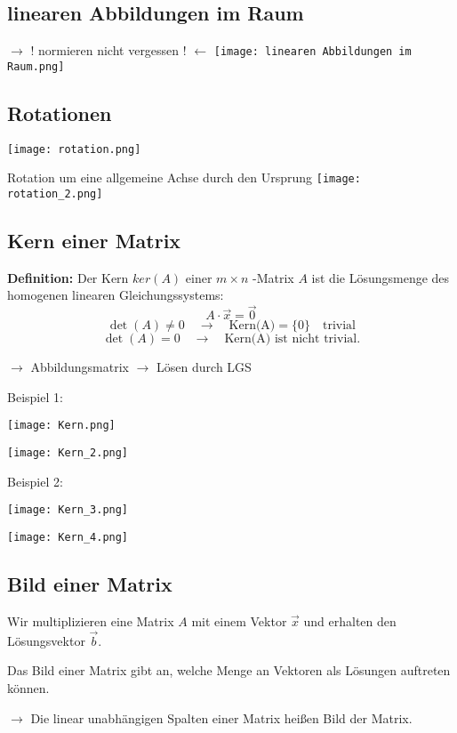 \begin{multicols*}{3}
    \subsection{ linearen Abbildungen im Raum}
    {$\rightarrow $ $!$ normieren nicht vergessen $!$ $\leftarrow$}
    {\texttt{[image: linearen Abbildungen im Raum.png]}}


   

    \subsection{ Rotationen}

    {\texttt{[image: rotation.png]}}

    {Rotation um eine allgemeine Achse durch den Ursprung}
    {\texttt{[image: rotation\_2.png]}}
    \vfill\null
    \columnbreak
    \subsection{ Kern einer Matrix}
    {\textbf{Definition:} Der Kern $ker(A)$ einer $m\times n$ -Matrix $A$ ist die Lösungsmenge des homogenen linearen
        Gleichungssystems: $$A\cdot \vec{x} = \vec{0}$$}
    {$$\det(A) \neq 0 \quad \rightarrow \quad \text{Kern(A)}=\{0\} \quad \text{trivial}$$}
    {$$\det(A)=0 \quad \rightarrow \quad \text{Kern(A) ist nicht trivial}.$$}

    {$\rightarrow$ Abbildungsmatrix  $\rightarrow$ Lösen durch LGS}

    {Beispiel 1:}

    {\texttt{[image: Kern.png]}}

    {\texttt{[image: Kern\_2.png]}}



    {Beispiel 2:}

    {\texttt{[image: Kern\_3.png]}}

    {\texttt{[image: Kern\_4.png]}}
    \vfill\null
    \columnbreak
    \subsection{ Bild einer Matrix}
    {Wir multiplizieren eine Matrix $A$  mit einem Vektor $\vec{x}$
        und erhalten den Lösungsvektor $\vec{b}$.}

    {Das Bild einer Matrix gibt an, welche Menge an Vektoren als Lösungen auftreten können.}

    {$\to$ Die linear unabhängigen Spalten einer Matrix heißen Bild der Matrix.}




\end{multicols*}
